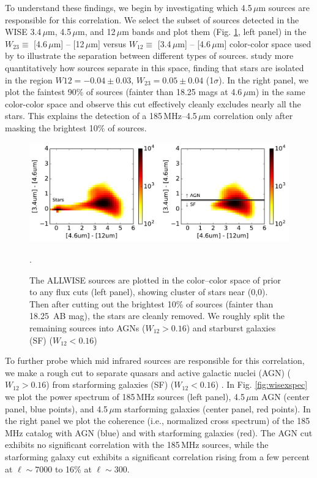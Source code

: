 \documentclass[numberedappendix]{emulateapj}
\begin{document}
To understand these findings, we begin by investigating which 4.5\,$\mu$m sources are responsible for this correlation. We select the subset of sources detected in the WISE 3.4\,$\mu$m, 4.5\,$\mu$m, and 12\,$\mu$m bands and plot them (Fig. \ref{fig:wisecolorcolor}, left panel) in the $W_{23}\equiv$ [4.6\,$\mu$m] -- [12\,$\mu$m] versus $W_{12}\equiv$ [3.4\,$\mu$m] -- [4.6\,$\mu$m] color-color space used by \citet{Wright2010} to illustrate the separation between different types of sources. \citet{nikutta14} study more quantitatively how sources separate in this space, finding that stars are isolated in the region $W{12}=-0.04\pm0.03$, $W_{23}=0.05\pm0.04$ (1$\sigma$). In the right panel, we plot the faintest 90\% of sources (fainter than 18.25 mags at 4.6\,$\mu$m) in the same color-color space and observe this cut effectively cleanly excludes nearly all the stars. This explains the detection of a 185\,MHz--4.5\,$\mu$m correlation only after masking the brightest 10\% of sources. 

\begin{figure}[h]
\centering
\includegraphics[width=6in]{images/wise_color_color_figure_max=1e-3_5Jy.pdf}
\caption{The ALLWISE sources are plotted in the color--color space of \citet{Wright2010} prior to any flux cuts (left panel), showing cluster of stars near (0,0). Then after cutting out the brightest 10\% of sources (fainter than 18.25\, AB mag), the stars are cleanly removed. We roughly split the remaining sources into AGNs ($W_{12}>0.16$) and starburst galaxies (SF) ($W_{12}<0.16$) \citep{nikutta14,kurcz16}}.
\label{fig:wisecolorcolor}
\end{figure}

To further probe which mid infrared sources are responsible for this correlation, we make a rough cut to separate quasars and active galactic nuclei (AGN) ($W_{12}>0.16$) from starforming galaxies (SF) ($W_{12}<0.16$) \citep{nikutta14,kurcz16}. In Fig. \ref{fig:wisexspec} we plot the power spectrum of 185\,MHz sources (left panel), 4.5\,$\mu$m AGN (center panel, blue points), and 4.5\,$\mu$m starforming galaxies (center panel, red points). In the right panel we plot the coherence (i.e., normalized cross spectrum) of the 185\,MHz catalog with AGN (blue) and with starforming galaxies (red). The AGN cut exhibits no significant correlation with the 185\,MHz sources, while the starforming galaxy cut exhibits a significant correlation rising from a few percent at $\ell\sim7000$ to 16\% at $\ell\sim300$. 
\end{document}
